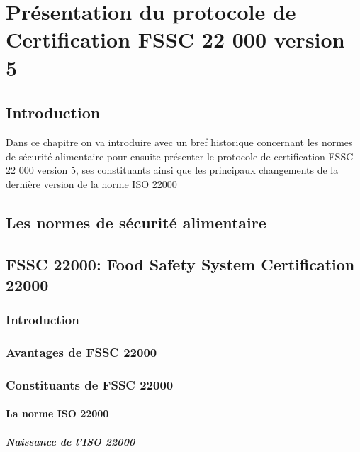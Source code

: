 
\setcounter{chapter}{0}
\chapter{ Présentation du protocole de Certification FSSC 22 000 version 5}
\minitoc %
\graphicspath{{Chapter2/figures/}}


\pagestyle{fancy}
\fancyhf{}
\fancyhead[R]{\bfseries\rightmark}
\fancyfoot[R]{\thepage}
\renewcommand{\headrulewidth}{0.5pt}
\renewcommand{\footrulewidth}{0pt}
\renewcommand{\chaptermark}[1]{\markboth{\MakeUppercase{\chaptername~\thechapter. #1 }}{}}
\renewcommand{\sectionmark}[1]{\markright{\thechapter.\thesection~ #1}}

\begin{spacing}{1.2}
\section*{Introduction}
Dans ce chapitre on va introduire avec un bref historique concernant les  normes de sécurité alimentaire pour ensuite présenter le protocole de certification FSSC 22 000 version 5, ses constituants ainsi que les principaux changements de la dernière version de la norme ISO 22000

\section{Les normes de sécurité alimentaire}
\section{FSSC 22000: Food Safety System Certification 22000}
\subsection*{Introduction}
\subsection{Avantages de FSSC 22000}
\subsection{Constituants de FSSC 22000}
\subsubsection{La norme ISO 22000}
\paragraph{Naissance de l’ISO 22000}


\end{spacing}
